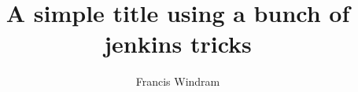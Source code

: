 \documentclass[]{article}
\title{A simple title using a bunch of jenkins tricks}
\author{Francis Windram}
\begin{document}
\maketitle

\begin{abstract}

\end{abstract}

\section{}
\end{document}
